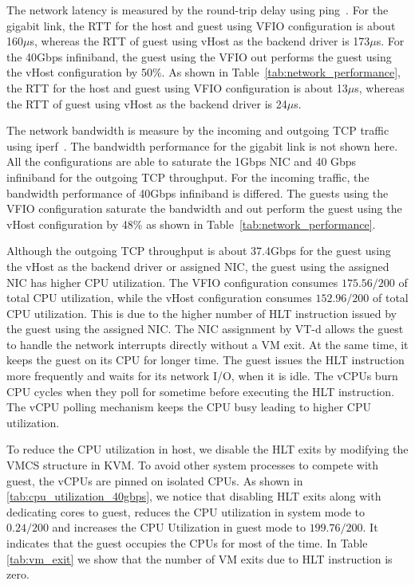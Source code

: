 The network latency is measured by the round-trip delay using
ping~\cite{ping}. For the gigabit link, the RTT for the host
and guest using VFIO configuration is about 160$\mu$s, whereas
the RTT of guest using vHost as the backend driver is
173$\mu$s. For the 40Gbps infiniband, the guest using the VFIO
out performs the guest using the vHost configuration by 50\%.
As shown in Table~\ref{tab:network_performance}, the RTT for
the host and guest using VFIO configuration is about 13$\mu$s,
whereas the RTT of guest using vHost as the backend driver is
24$\mu$s.

The network bandwidth is measure by the incoming and outgoing
TCP traffic using iperf~\cite{iperf}. The bandwidth
performance for the gigabit link is not shown here. All the
configurations are able to saturate the 1Gbps NIC and 40 Gbps
infiniband for the outgoing TCP throughput. For the incoming
traffic, the bandwidth performance of 40Gbps infiniband is
differed. The guests using the VFIO configuration saturate the
bandwidth and out perform the guest using the vHost
configuration by 48\% as shown in
Table~\ref{tab:network_performance}.

Although the outgoing TCP throughput is about 37.4Gbps for the
guest using the vHost as the backend driver or assigned NIC,
the guest using the assigned NIC has higher CPU utilization.
The VFIO configuration consumes $175.56/200$ of total CPU
utilization, while the vHost configuration consumes
$152.96/200$ of total CPU utilization. This is due to the
higher number of HLT instruction issued by the guest using the
assigned NIC. The NIC assignment by VT-d allows the guest to
handle the network interrupts directly without a VM exit. At
the same time, it keeps the guest on its CPU for longer time.
The guest issues the HLT instruction more frequently and waits
for its network I/O, when it is idle. The vCPUs burn CPU
cycles when they poll for sometime before executing the HLT
instruction. The vCPU polling mechanism keeps the CPU busy
leading to higher CPU utilization.

To reduce the CPU utilization in host, we disable the HLT
exits by modifying the VMCS structure in KVM. To avoid other
system processes to compete with guest, the vCPUs are pinned
on isolated CPUs. As shown in
\ref{tab:cpu_utilization_40gbps}, we notice that disabling HLT
exits along with dedicating cores to guest, reduces the CPU
utilization in system mode to $0.24/200$ and increases the CPU
Utilization in guest mode to $199.76/200$. It indicates that
the guest occupies the CPUs for most of the time. In Table
\ref{tab:vm_exit} we show that the number of VM exits due to
HLT instruction is zero.
